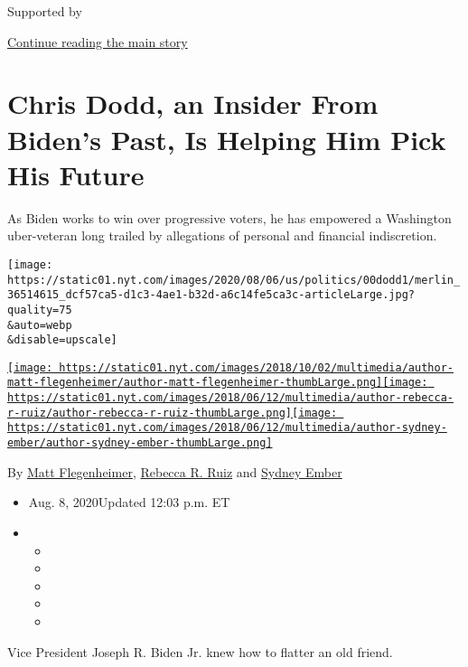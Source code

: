 Supported by

\protect\hyperlink{after-sponsor}{Continue reading the main story}

\hypertarget{chris-dodd-an-insider-from-bidens-past-is-helping-him-pick-his-future}{%
\section{Chris Dodd, an Insider From Biden's Past, Is Helping Him Pick
His
Future}\label{chris-dodd-an-insider-from-bidens-past-is-helping-him-pick-his-future}}

As Biden works to win over progressive voters, he has empowered a
Washington uber-veteran long trailed by allegations of personal and
financial indiscretion.

\texttt{[image: https://static01.nyt.com/images/2020/08/06/us/politics/00dodd1/merlin\_36514615\_dcf57ca5-d1c3-4ae1-b32d-a6c14fe5ca3c-articleLarge.jpg?quality=75\\\&auto=webp\\\&disable=upscale]}

\href{https://www.nytimes.com/by/matt-flegenheimer}{\texttt{[image: https://static01.nyt.com/images/2018/10/02/multimedia/author-matt-flegenheimer/author-matt-flegenheimer-thumbLarge.png]}}\href{https://www.nytimes.com/by/rebecca-r-ruiz}{\texttt{[image: https://static01.nyt.com/images/2018/06/12/multimedia/author-rebecca-r-ruiz/author-rebecca-r-ruiz-thumbLarge.png]}}\href{https://www.nytimes.com/by/sydney-ember}{\texttt{[image: https://static01.nyt.com/images/2018/06/12/multimedia/author-sydney-ember/author-sydney-ember-thumbLarge.png]}}

By \href{https://www.nytimes.com/by/matt-flegenheimer}{Matt
Flegenheimer}, \href{https://www.nytimes.com/by/rebecca-r-ruiz}{Rebecca
R. Ruiz} and \href{https://www.nytimes.com/by/sydney-ember}{Sydney
Ember}

\begin{itemize}
\item
  Aug. 8, 2020Updated 12:03 p.m. ET
\item
  \begin{itemize}
  \item
  \item
  \item
  \item
  \item
  \end{itemize}
\end{itemize}

Vice President Joseph R. Biden Jr. knew how to flatter an old friend.


